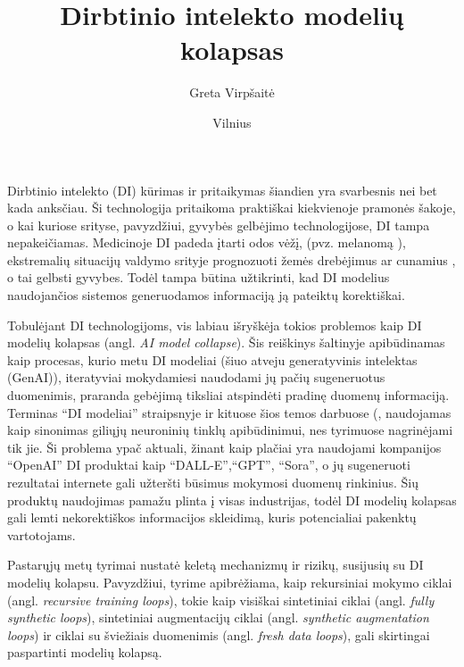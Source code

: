 \documentclass{VUMIFInfKursinis}
\title{Dirbtinio intelekto modelių kolapsas}
\author{Greta Virpšaitė}
\date{Vilnius \\ \the\year}
\begin{document}
\maketitle

\tableofcontents

Dirbtinio intelekto (DI) kūrimas ir pritaikymas šiandien yra svarbesnis nei bet kada anksčiau. Ši technologija pritaikoma praktiškai kiekvienoje pramonės šakoje, o kai kuriose srityse, pavyzdžiui, gyvybės gelbėjimo technologijose, DI tampa nepakeičiamas. Medicinoje DI padeda įtarti odos vėžį, (pvz. melanomą \cite{Melanoma}), ekstremalių situacijų valdymo srityje prognozuoti žemės drebėjimus \cite{Drebejimai} ar cunamius \cite{Cunamiai}, o tai gelbsti gyvybes. Todėl tampa būtina užtikrinti, kad DI modelius naudojančios sistemos generuodamos informaciją ją pateiktų korektiškai.

Tobulėjant DI technologijoms, vis labiau išryškėja tokios problemos kaip DI modelių kolapsas (angl. \textsl{AI model collapse}). Šis reiškinys šaltinyje \cite{AICollapseNature} apibūdinamas kaip procesas, kurio metu DI modeliai (šiuo atveju generatyvinis intelektas (GenAI)), iteratyviai mokydamiesi naudodami jų pačių sugeneruotus duomenimis, praranda gebėjimą tiksliai atspindėti pradinę duomenų informaciją. Terminas \enquote{DI modeliai} \cite{AICollapseNature} straipsnyje ir kituose šios temos darbuose (\cite{DesniuPasiulymai, modelCollapseRef}, naudojamas kaip sinonimas giliųjų neuroninių tinklų apibūdinimui, nes tyrimuose nagrinėjami tik jie. Ši problema ypač aktuali, žinant kaip plačiai yra naudojami kompanijos \enquote{OpenAI} DI produktai kaip \enquote{DALL-E},\enquote{GPT}, \enquote{Sora}, o jų sugeneruoti rezultatai internete gali užteršti būsimus mokymosi duomenų rinkinius. Šių produktų naudojimas pamažu plinta į visas industrijas, todėl DI modelių kolapsas gali lemti nekorektiškos informacijos skleidimą, kuris potencialiai pakenktų vartotojams.  

Pastarųjų metų tyrimai nustatė keletą mechanizmų ir rizikų, susijusių su DI modelių kolapsu. Pavyzdžiui, tyrime 
\cite{ModelsGoMAD} apibrėžiama, kaip rekursiniai mokymo ciklai (angl. \textsl{recursive training loops}), tokie kaip visiškai sintetiniai ciklai (angl. \textsl{fully synthetic loops}), sintetiniai augmentacijų ciklai (angl. \textsl{synthetic augmentation loops}) ir ciklai su šviežiais duomenimis (angl. \textsl{fresh data loops}), gali skirtingai paspartinti modelių kolapsą. 
\end{document}
